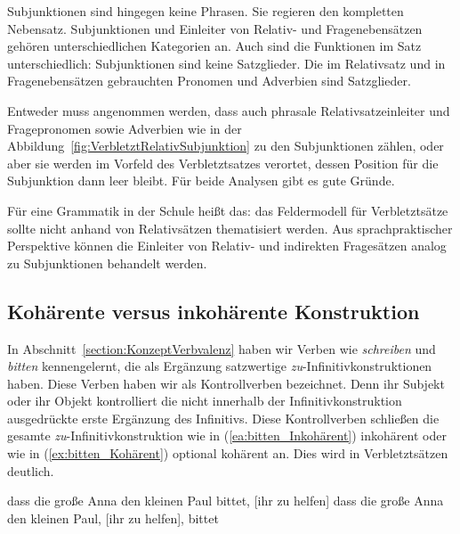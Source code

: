 Subjunktionen sind hingegen keine Phrasen. Sie regieren den kompletten Nebensatz. Subjunktionen und Einleiter von Relativ- und Fragenebensätzen gehören unterschiedlichen Kategorien an. Auch sind die Funktionen im Satz unterschiedlich: Subjunktionen sind keine Satzglieder. Die im Relativsatz und in Fragenebensätzen gebrauchten Pronomen und Adverbien sind Satzglieder.

Entweder muss angenommen werden, dass auch phrasale Relativsatzeinleiter und Fragepronomen sowie Adverbien wie in der Abbildung~\ref{fig:VerbletztRelativSubjunktion} zu den Subjunktionen zählen, oder aber sie werden im Vorfeld des Verbletztsatzes verortet, dessen Position für die Subjunktion dann leer bleibt. Für beide Analysen gibt es gute Gründe.

Für eine Grammatik in der Schule heißt das: das Feldermodell für Verbletztsätze sollte nicht anhand von Relativsätzen thematisiert werden. Aus sprachpraktischer Perspektive können die Einleiter von Relativ- und indirekten Fragesätzen analog zu Subjunktionen behandelt werden.    



\subsection{Kohärente versus inkohärente Konstruktion}\label{subsection:KohärenteKonstruktion}

In Abschnitt~\ref{section:KonzeptVerbvalenz} haben wir Verben wie \textit{schreiben} und \textit{bitten} kennengelernt, die als Ergänzung satzwertige \textit{zu}-Infinitivkonstruktionen haben. Diese Verben haben wir als Kontrollverben bezeichnet. Denn ihr Subjekt oder ihr Objekt kontrolliert die nicht innerhalb der Infinitivkonstruktion ausgedrückte erste Ergänzung des Infinitivs. Diese Kontrollverben schließen die gesamte \textit{zu}-Infinitivkonstruktion wie in (\ref{ea:bitten_Inkohärent}) inkohärent oder wie in (\ref{ex:bitten_Kohärent}) optional kohärent an. Dies wird in Verbletztsätzen deutlich.

\ea 
\ea \label{ea:bitten_Inkohärent} dass die große Anna den kleinen Paul bittet, [ihr zu helfen]
\ex \label{ex:bitten_Kohärent} dass die große Anna den kleinen Paul, [ihr zu helfen], bittet
\z 
\z

